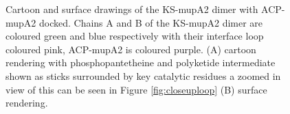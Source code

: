 		\setlength\fboxsep{5pt}
		\setlength\fboxrule{1.5pt}
		\begin{figure}
		\centering
		\caption[Cartoon and surface drawings of the KS-mupA2 dimer with ACP-mupA2 docked.]{Cartoon and surface drawings of the KS-mupA2 dimer with ACP-mupA2 docked. Chains A and B of the KS-mupA2 dimer are coloured green and blue respectively with their interface loop coloured pink, ACP-mupA2 is coloured purple. (A) cartoon rendering with phosphopantetheine and polyketide intermediate shown as sticks surrounded by key catalytic residues a zoomed in view of this can be seen in Figure \ref{fig:closeuploop} (B) surface rendering.}
		\label{fig:cartoonAndSurface}
		\end{figure}	


